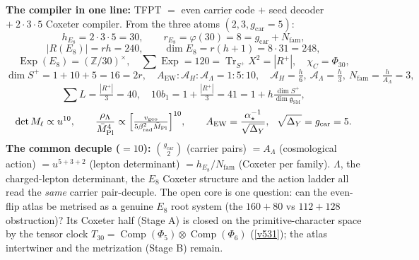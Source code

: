 \documentclass[11pt,a4paper]{article}
\newcommand{\Mbar}{\bar M_{\mathrm{Pl}}}
\newcommand{\gcar}{g_{\mathrm{car}}}
\newcommand{\Nfam}{N_{\mathrm{fam}}}
\newcommand{\useed}{u}
\newcommand{\betarad}{\beta_{\mathrm{rad}}}
\newcommand{\ainv}{\alpha^{-1}_\star}
\newcommand{\AEW}{A_{\mathrm{EW}}}
\newcommand{\AL}{\mathcal A_\Lambda}
\newcommand{\AH}{\mathcal A_H}
\newcommand{\dimg}{\dim\mathfrak g_{\mathrm{SM}}}
\theoremstyle{definition}
\begin{document}
\par\medskip\noindent\textbf{The compiler in one line:} TFPT $=$ even carrier code $+$ seed decoder
$+\ 2{\cdot}3{\cdot}5$ Coxeter compiler. From the three atoms $(2,3,\gcar{=}5)$:
\[
  h_{E_8}=2{\cdot}3{\cdot}5=30,\qquad r_{E_8}=\varphi(30)=8=\gcar{+}\Nfam,
\]
\[
  |R(E_8)|=rh=240,\qquad \dim E_8=r(h{+}1)=8{\cdot}31=248,
\]
\[
  \operatorname{Exp}(E_8)=(\mathbb Z/30)^\times,\quad \textstyle\sum\operatorname{Exp}=120=\operatorname{Tr}_{S^+}X^2=|R^+|,\quad
  \chi_C=\Phi_{30},
\]
\[
  \dim S^+=1+10+5=16=2r,\quad
  \AEW{:}\AH{:}\AL=1{:}5{:}10,\quad
  \AH=\tfrac h6,\ \AL=\tfrac h3,\ \Nfam=\tfrac h{A_\Lambda}=3,
\]
\[
  \textstyle\sum L=\tfrac{|R^+|}{3}=40,\quad
  10b_1=1+\tfrac{|R^+|}{3}=41=1+h\tfrac{\dim S^+}{\dimg},
\]
\[
  \det M_\ell\propto\useed^{10},\qquad
  \frac{\rho_\Lambda}{\Mbar^4}\propto\Bigl[\tfrac{v_{\mathrm{geo}}}{5\betarad^2\Mbar}\Bigr]^{10},\qquad
  A_{\mathrm{EW}}=\frac{\ainv}{\sqrt{\Delta_Y}},\ \ \sqrt{\Delta_Y}=\gcar=5 .
\]
\textbf{The common decuple ($=10$):} $\binom{\gcar}{2}$ (carrier pairs) $=A_\Lambda$ (cosmological
action) $=\useed^{5+3+2}$ (lepton determinant) $=h_{E_8}/\Nfam$ (Coxeter per family). $\Lambda$, the
charged-lepton determinant, the $E_8$ Coxeter structure and the action ladder all read the \emph{same}
carrier pair-decuple. The open core is one question: can the even-flip atlas be metrised as a genuine
$E_8$ root system (the $160{+}80$ vs $112{+}128$ obstruction)? Its Coxeter half (Stage A) is closed on
the primitive-character space by the tensor clock $T_{30}=\operatorname{Comp}(\Phi_5)\otimes
\operatorname{Comp}(\Phi_6)$ (\vref{v531}); the atlas intertwiner and the metrization (Stage B) remain.

\clearpage
\end{document}
